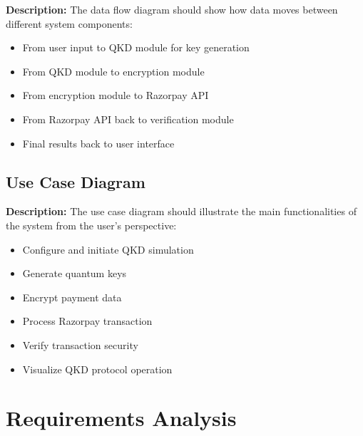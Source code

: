 \documentclass[conference]{IEEEtran}
\begin{document}
\textbf{Description:} The data flow diagram should show how data moves between different system components:
\begin{itemize}
    \item From user input to QKD module for key generation
    \item From QKD module to encryption module
    \item From encryption module to Razorpay API
    \item From Razorpay API back to verification module
    \item Final results back to user interface
\end{itemize}

\subsection{Use Case Diagram}

\textbf{Description:} The use case diagram should illustrate the main functionalities of the system from the user's perspective:
\begin{itemize}
    \item Configure and initiate QKD simulation
    \item Generate quantum keys
    \item Encrypt payment data
    \item Process Razorpay transaction
    \item Verify transaction security
    \item Visualize QKD protocol operation
\end{itemize}

\section{Requirements Analysis}
\end{document}
